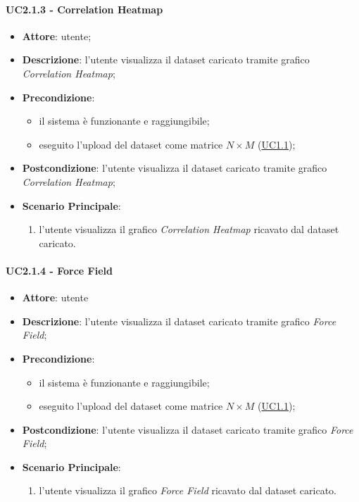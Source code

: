     \paragraph{UC2.1.3 - Correlation Heatmap}
    \label{uc2.1.3}
    \begin{itemize}
    \item \textbf{Attore}: utente;
    \item \textbf{Descrizione}: l'utente visualizza il dataset caricato tramite grafico \emph{Correlation Heatmap};
    \item \textbf{Precondizione}:
    \begin{itemize}
        \item il sistema è funzionante e raggiungibile;
        \item eseguito l'upload del dataset come matrice $N\times M$ (\hyperref[uc1.1]{UC1.1});
    \end{itemize}
    \item \textbf{Postcondizione}: l'utente visualizza il dataset caricato tramite grafico \emph{Correlation Heatmap};
    \item \textbf{Scenario Principale}: 
        \begin{enumerate}
            \item l'utente visualizza il grafico \emph{Correlation Heatmap} ricavato dal dataset caricato.
        \end{enumerate}
    \end{itemize}
    
    \paragraph{UC2.1.4 - Force Field}
    \label{uc2.1.4}
    \begin{itemize}
    \item \textbf{Attore}: utente
    \item \textbf{Descrizione}: l'utente visualizza il dataset caricato tramite grafico \emph{Force Field};
    \item \textbf{Precondizione}:
    \begin{itemize}
        \item il sistema è funzionante e raggiungibile;
       \item eseguito l'upload del dataset come matrice $N\times M$ (\hyperref[uc1.1]{UC1.1});
    \end{itemize}
    \item \textbf{Postcondizione}: l'utente visualizza il dataset caricato tramite grafico \emph{Force Field};
    \item \textbf{Scenario Principale}: 
        \begin{enumerate}
            \item l'utente visualizza il grafico \emph{Force Field} ricavato dal dataset caricato.
        \end{enumerate}
    \end{itemize}
    
